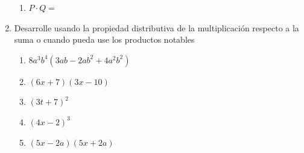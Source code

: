 \documentclass[letterpaper,fleqn]{article}
\begin{document}
\begin{enumerate}
\begin{enumerate}
 \item $P\cdot Q=$
\end{enumerate}
\item Desarrolle usando la propiedad distributiva de la multiplicación respecto a la suma o cuando pueda use los productos notables
\begin{enumerate}
 \item $8a^{3}b^{4}(3ab-2ab^{2}+4a^{2}b^{2})$
 \item $(6x+7)(3x-10)$
 \item $(3t+7)^{2}$
 \item $(4x-2)^{3}$
 \item $(5x-2a)(5x+2a)$
\end{enumerate}
 \end{enumerate}
\end{document}
